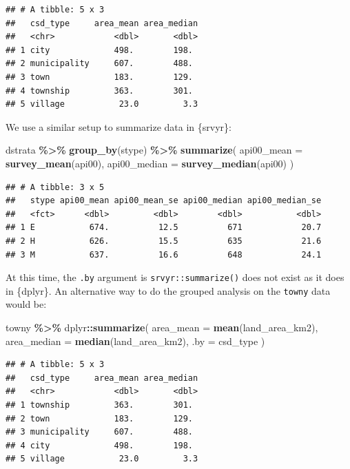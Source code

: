 \documentclass[
]{krantz}
\makeatletter
\newenvironment{Shaded}{\begin{snugshade}}{\end{snugshade}}
\newcommand{\AttributeTok}[1]{\textcolor[rgb]{0.27,0.27,0.27}{#1}}
\newcommand{\FunctionTok}[1]{\textcolor[rgb]{0.27,0.27,0.27}{\textbf{#1}}}
\newcommand{\NormalTok}[1]{#1}
\newcommand{\SpecialCharTok}[1]{\textcolor[rgb]{0.43,0.43,0.43}{\textbf{#1}}}
\newenvironment{kframe}{%
\medskip{}
\setlength{\fboxsep}{.8em}
 \def\at@end@of@kframe{}%
 \ifinner\ifhmode%
  \def\at@end@of@kframe{\end{minipage}}%
  \begin{minipage}{\columnwidth}%
 \fi\fi%
 \def\FrameCommand##1{\hskip\@totalleftmargin \hskip-\fboxsep
 \colorbox{shadecolor}{##1}\hskip-\fboxsep
     \hskip-\linewidth \hskip-\@totalleftmargin \hskip\columnwidth}%
 \MakeFramed {\advance\hsize-\width
   \@totalleftmargin\z@ \linewidth\hsize
   \@setminipage}}%
 {\par\unskip\endMakeFramed%
 \at@end@of@kframe}
\renewenvironment{Shaded}{\begin{kframe}}{\end{kframe}}
\makeatother
\begin{document}
\begin{verbatim}
## # A tibble: 5 x 3
##   csd_type     area_mean area_median
##   <chr>            <dbl>       <dbl>
## 1 city             498.        198. 
## 2 municipality     607.        488. 
## 3 town             183.        129. 
## 4 township         363.        301. 
## 5 village           23.0         3.3
\end{verbatim}

We use a similar setup to summarize data in \{srvyr\}:

\begin{Shaded}
\begin{Highlighting}[]
\NormalTok{dstrata }\SpecialCharTok{\%\textgreater{}\%}
  \FunctionTok{group\_by}\NormalTok{(stype) }\SpecialCharTok{\%\textgreater{}\%}
  \FunctionTok{summarize}\NormalTok{(}
    \AttributeTok{api00\_mean =} \FunctionTok{survey\_mean}\NormalTok{(api00),}
    \AttributeTok{api00\_median =} \FunctionTok{survey\_median}\NormalTok{(api00)}
\NormalTok{  )}
\end{Highlighting}
\end{Shaded}

\begin{verbatim}
## # A tibble: 3 x 5
##   stype api00_mean api00_mean_se api00_median api00_median_se
##   <fct>      <dbl>         <dbl>        <dbl>           <dbl>
## 1 E           674.          12.5          671            20.7
## 2 H           626.          15.5          635            21.6
## 3 M           637.          16.6          648            24.1
\end{verbatim}

At this time, the \texttt{.by} argument is \texttt{srvyr::summarize()} does not exist as it does in \{dplyr\}. An alternative way to do the grouped analysis on the \texttt{towny} data would be:

\begin{Shaded}
\begin{Highlighting}[]
\NormalTok{towny }\SpecialCharTok{\%\textgreater{}\%}
\NormalTok{  dplyr}\SpecialCharTok{::}\FunctionTok{summarize}\NormalTok{(}
    \AttributeTok{area\_mean =} \FunctionTok{mean}\NormalTok{(land\_area\_km2),}
    \AttributeTok{area\_median =} \FunctionTok{median}\NormalTok{(land\_area\_km2),}
    \AttributeTok{.by =}\NormalTok{ csd\_type}
\NormalTok{  )}
\end{Highlighting}
\end{Shaded}

\begin{verbatim}
## # A tibble: 5 x 3
##   csd_type     area_mean area_median
##   <chr>            <dbl>       <dbl>
## 1 township         363.        301. 
## 2 town             183.        129. 
## 3 municipality     607.        488. 
## 4 city             498.        198. 
## 5 village           23.0         3.3
\end{verbatim}
\end{document}
